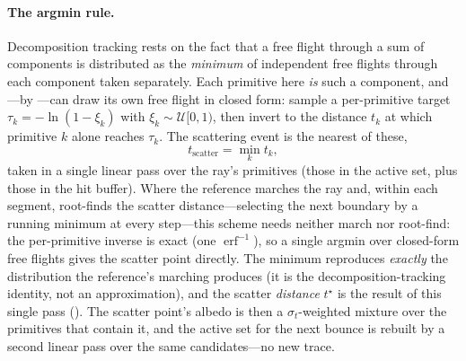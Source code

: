 \paragraph{The argmin rule.} Decomposition tracking rests on the fact that a free flight through a sum
of components is distributed as the \emph{minimum} of independent free flights through each component
taken separately. Each primitive here \emph{is} such a component, and---by ---can
draw its own free flight in closed form: sample a per-primitive target
$\tau_k = -\ln(1-\xi_k)$ with $\xi_k\sim\mathcal{U}[0,1)$, then invert to the distance $t_k$ at which
primitive $k$ alone reaches $\tau_k$. The scattering event is the nearest of these,
\[
  t_{\text{scatter}} = \min_k t_k ,
\]
taken in a single linear pass over the ray's primitives (those in the active set, plus those in the
hit buffer). Where the reference marches the ray and, within each segment, root-finds the scatter
distance---selecting the next boundary by a running minimum at every step---this scheme needs neither
march nor root-find: the per-primitive inverse is exact (one $\operatorname{erf}^{-1}$), so a single
argmin over closed-form free flights gives the scatter point directly. The minimum reproduces
\emph{exactly} the distribution the reference's marching produces (it is the decomposition-tracking
identity, not an approximation), and the scatter \emph{distance} $t^\star$ is the result of this single
pass (). The scatter point's albedo is then a $\sigma_t$-weighted mixture over the
primitives that contain it, and the active set for the next bounce is rebuilt by a second linear pass
over the same candidates---no new trace.

